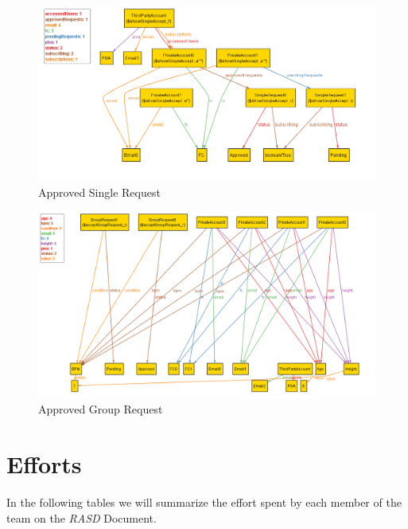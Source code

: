 \documentclass[titlepage]{article}
\begin{document}
		\begin{figure}[H]
			\center
  			\includegraphics[width=\textwidth]{Alloy/singleRequest.png}
			\caption{Approved Single Request}
			\label{fig:sing}
		\end{figure}

		\begin{figure}[H]
			\center
  			\includegraphics[width=\textwidth]{Alloy/groupRequest.png}
			\caption{Approved Group Request}
			\label{fig:groupg}
		\end{figure}

	\section{Efforts}
	In the following tables we will summarize the effort spent by each member of the team on the {\it RASD} Document.
	
\end{document}
